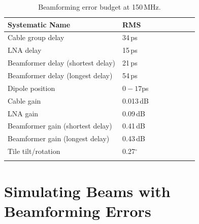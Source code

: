  \begin{table}[h]
 \centering
 \caption{ \label{table:systematictable}Beamforming error budget at 150\,MHz.}
 \begin{tabular}{llllllll}
 \hline\hline
 Systematic Name & RMS \\
 \hline\hline
Cable group delay & 34\,ps \\
LNA delay & 15\,ps  \\
Beamformer delay (shortest delay) & 21\,ps   \\
Beamformer delay (longest delay) & 54\,ps   \\
Dipole position & $0-17$ps & \\
\hline
Cable gain & 0.013\,dB\\
LNA gain & 0.09\,dB \\
Beamformer gain (shortest delay) & 0.41\,dB \\
Beamformer gain (longest delay) & 0.43\,dB \\
\hline
Tile tilt/rotation & 0.27$^\circ$ \\
     \hline\\
 \end{tabular}
 \end{table}

\section{Simulating Beams with Beamforming Errors}
\label{sec:simulations}

